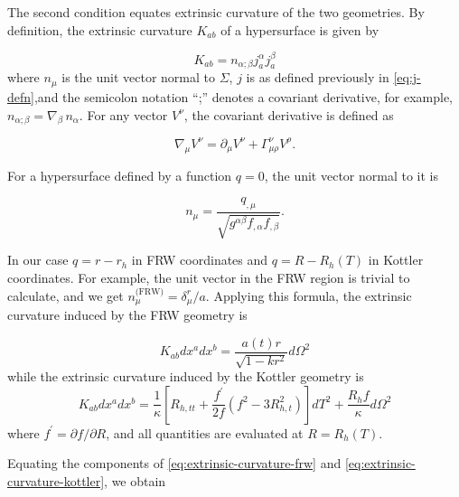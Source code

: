 The second condition equates extrinsic curvature of the two geometries. By definition, the extrinsic curvature $K_{ab}$ of a hypersurface is given by

\begin{equation}
  K_{ab} = n_{\alpha;\beta} j^{\alpha}_{a} j^{\beta}_{a}
  \label{eq:extrinsic-curvature-defn}
\end{equation}
where $n_{\mu}$ is the unit vector normal to $\Sigma$, $j$ is as defined previously in \autoref{eq:j-defn},and the semicolon notation ``;'' denotes a covariant derivative, for example, $n_{\alpha;\beta} = \nabla_{\beta}\, n_{\alpha}$. For any vector $V^{\nu}$, the covariant derivative is defined as

\begin{equation}
  \nabla_{\mu}V^{\nu} = \partial_{\mu}V^{\nu} + \Gamma^{\nu}_{\mu \rho} V^{\rho}.
  \label{eq:covariant-derivative-defn}
\end{equation}

For a hypersurface defined by a function $q = 0$, the unit vector normal to it is

\begin{equation}
  n_{\mu} = \frac{q_{,\mu}}{\sqrt{g^{\alpha \beta} f_{,\alpha} f_{,\beta}}}.
  \label{eq:unit-normal-vector}
\end{equation}

In our case $q = r-r_h$ in FRW coordinates and $q = R - R_h(T)$ in Kottler coordinates. For example, the unit vector in the FRW region is trivial to calculate, and we get $n_{\mu}^{\text{(FRW)}} = \delta^r_{\mu}/a$. Applying this formula, the extrinsic curvature induced by the FRW geometry is

\begin{equation}
  K_{ab} dx^a dx^b = \frac{a(t)r}{\sqrt{1-kr^2}} d \Omega^2
  \label{eq:extrinsic-curvature-frw}
\end{equation}
while the extrinsic curvature induced by the Kottler geometry is
\begin{equation}
  K_{ab} dx^a dx^b = \frac{1}{\kappa} \left [ R_{h,tt} + \frac{f^{\prime}}{2f}(f^2 - 3R_{h,t}^2) \right ] dT^2 + \frac{R_h f}{\kappa} d \Omega^2
  \label{eq:extrinsic-curvature-kottler}
\end{equation}
where $f^{\prime} = \partial f / \partial R$, and all quantities are evaluated at $R = R_h(T)$.

Equating the components of \autoref{eq:extrinsic-curvature-frw} and \autoref{eq:extrinsic-curvature-kottler}, we obtain


